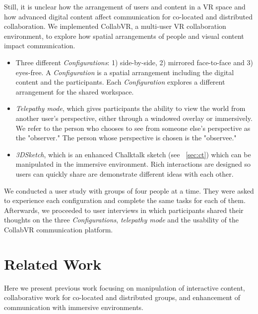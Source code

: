 \documentclass[chi_draft]{sigchi}
\begin{document}
Still, it is unclear how the arrangement of users and content in a VR space and how advanced digital content affect communication for co-located and distributed collaboration. We implemented CollabVR, a multi-user VR collaboration environment, to explore how
spatial arrangements of people and visual content impact communication.
\begin{itemize}
\item Three different \textit{Configurations}: 1) side-by-side, 2) mirrored face-to-face and 3) eyes-free. A \textit{Configuration} is a spatial arrangement including the digital content and the participants. Each \textit{Configuration} explores a different arrangement for the shared workspace.
\item \textit{Telepathy mode}, which gives participants the ability to view the world from another user's perspective, either through a windowed overlay or immersively. We refer to the person who chooses to see from someone else's perspective as the "observer." The person whose perspective is chosen is the "observee."
\item \textit{3DSketch}, which is an enhanced Chalktalk sketch (see ~\ref{sec:ct}) which can be manipulated in the immersive environment. Rich interactions are designed so users can quickly share are demonstrate different ideas with each other.
\end{itemize}
We conducted a user study with groups of four people at a time. They were asked to experience each configuration and complete the same tasks for each of them. Afterwards, we proceeded to user interviews in which participants shared their thoughts on the three \textit{Configurations}, \textit{telepathy mode} and the usability of the CollabVR communication platform.

\section{Related Work}
Here we present previous work focusing on manipulation of interactive content, collaborative work for co-located and distributed groups, and enhancement of communication with immersive environments.

\end{document}
